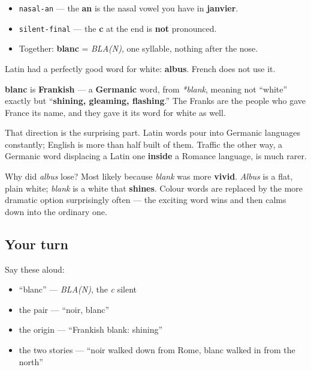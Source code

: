 \begin{sounds}
\begin{itemize}
\raggedright
  \item \texttt{nasal-an} — the \textbf{an} is the nasal vowel you have in \textbf{janvier}.
  \item \texttt{silent-final} — the \textbf{c} at the end is \textbf{not} pronounced.
  \item Together: \textbf{blanc} = \emph{BLA(N)}, one syllable, nothing after the nose.
\end{itemize}
\end{sounds}

\begin{cousinweb}
Latin had a perfectly good word for white: \textbf{albus}. French does not use it.

\textbf{blanc} is \textbf{Frankish} — a \textbf{Germanic} word, from \emph{*blank}, meaning not \textquotedblleft{}white\textquotedblright{} exactly but \textquotedblleft{}\textbf{shining, gleaming, flashing}.\textquotedblright{} The Franks are the people who gave France its name, and they gave it its word for white as well.

That direction is the surprising part. Latin words pour into Germanic languages constantly; English is more than half built of them. Traffic the other way, a Germanic word displacing a Latin one \textbf{inside} a Romance language, is much rarer.

Why did \emph{albus} lose? Most likely because \emph{blank} was more \textbf{vivid}. \emph{Albus} is a flat, plain white; \emph{blank} is a white that \textbf{shines}. Colour words are replaced by the more dramatic option surprisingly often — the exciting word wins and then calms down into the ordinary one.
\end{cousinweb}

\subsection*{Your turn}
Say these aloud:

\begin{itemize}
\raggedright
  \item \textquotedblleft{}blanc\textquotedblright{} — \emph{BLA(N)}, the \emph{c} silent
  \item the pair — \textquotedblleft{}noir, blanc\textquotedblright{}
  \item the origin — \textquotedblleft{}Frankish blank: shining\textquotedblright{}
  \item the two stories — \textquotedblleft{}noir walked down from Rome, blanc walked in from the north\textquotedblright{}
\end{itemize}

